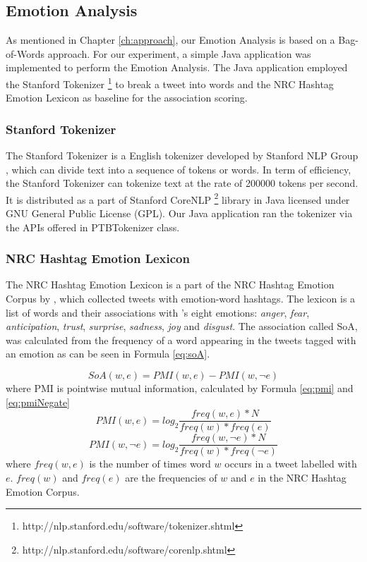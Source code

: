 \subsection{Emotion Analysis}
As mentioned in Chapter \ref{ch:approach}, our Emotion Analysis is based on a Bag-of-Words approach. For our experiment, a simple Java application was implemented to perform the Emotion Analysis. The Java application employed the Stanford Tokenizer \footnote{http://nlp.stanford.edu/software/tokenizer.shtml} to break a tweet into words and the NRC Hashtag Emotion Lexicon \citep{mohammad2014using} as baseline for the association scoring.

\subsubsection{Stanford Tokenizer}
The Stanford Tokenizer is a English tokenizer developed by Stanford NLP Group \citep{manning-EtAl:2014:P14-5}, which can divide text into a sequence of tokens or words. In term of efficiency, the Stanford Tokenizer can tokenize text at the rate of 200000 tokens per second. It is distributed as a part of Stanford CoreNLP \footnote{http://nlp.stanford.edu/software/corenlp.shtml} library in Java licensed under GNU General Public License (GPL). Our Java application ran the tokenizer via the APIs offered in PTBTokenizer class.

\subsubsection{NRC Hashtag Emotion Lexicon}
The NRC Hashtag Emotion Lexicon is a part of the NRC Hashtag Emotion Corpus by \citet{mohammad2014using}, which collected tweets with emotion-word hashtags. The lexicon is a list of words and their associations with \citep{plutchik2001nature}'s eight emotions: \textit{anger}, \textit{fear}, \textit{anticipation}, \textit{trust}, \textit{surprise}, \textit{sadness}, \textit{joy} and \textit{disgust}. The association called SoA, was calculated from the frequency of a word appearing in the tweets tagged with an emotion as can be seen in Formula \ref{eq:soA}.

\begin{equation}
\label{eq:soA}
	SoA(w, e) = PMI(w, e) - PMI(w, \neg{e})
\end{equation}
where PMI is pointwise mutual information, calculated by Formula \ref{eq:pmi} and \ref{eq:pmiNegate}
\begin{equation}
\label{eq:pmi}
	PMI(w, e) = log_2\frac{freq(w, e) * N}{freq(w) * freq(e)}
\end{equation}
\begin{equation}
\label{eq:pmiNegate}
	PMI(w, \neg{e}) = log_2\frac{freq(w, \neg{e}) * N}{freq(w) * freq(\neg{e})}	
\end{equation}
where \(freq(w,e)\) is the number of times word \(w\) occurs in a tweet labelled with \(e\). \(freq(w)\) and \(freq(e)\) are the frequencies of \(w\) and \(e\) in the NRC Hashtag Emotion Corpus.

